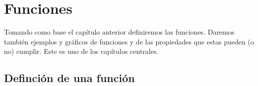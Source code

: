 \chapter{Funciones}%
\label{cha:Funciones}

\begin{primerpar}
	Tomando como base el capítulo anterior definiremos las funciones. Daremos también ejemplos y gráficos de funciones y
de las propiedades que estas pueden (o no) cumplir. Este es uno de los capítulos centrales.
\end{primerpar}

\section{Definción de una función}%
\label{sec:Definción de una función}

